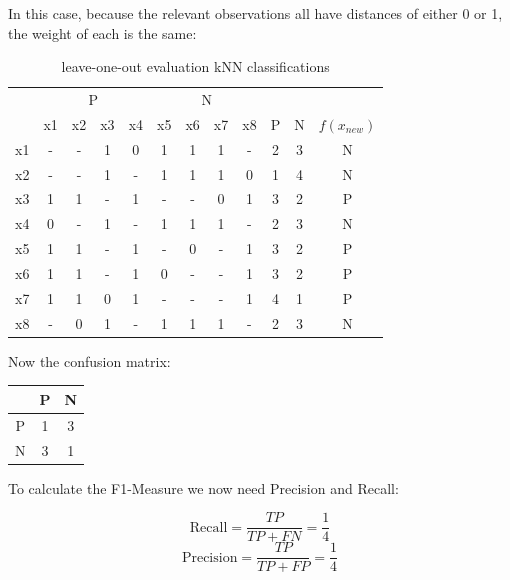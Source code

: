 \documentclass{article}
\begin{document}
\begin{enumerate}[leftmargin=\labelsep]
In this case, because the relevant observations all
have distances of either 0 or 1, the weight of each
is the same:

\begin{table}[H]
  \centering
  \begin{tabular}{c|cccc|cccc|ccc}
    \multicolumn{1}{c}{} & \multicolumn{4}{c}{P} & \multicolumn{4}{c}{N}  \\
      & x1 & x2 & x3 & x4 & x5 & x6 & x7 & x8 & P & N & $f(x_{new})$ \\ \hline
  x1  & -  & -  & 1  & 0  & 1  & 1  & 1  & -  & 2 & 3 & N \\
  x2  & -  & -  & 1  & -  & 1  & 1  & 1  & 0  & 1 & 4 & N \\
  x3  & 1  & 1  & -  & 1  & -  & -  & 0  & 1  & 3 & 2 & P \\
  x4  & 0  & -  & 1  & -  & 1  & 1  & 1  & -  & 2 & 3 & N \\
  x5  & 1  & 1  & -  & 1  & -  & 0  & -  & 1  & 3 & 2 & P \\
  x6  & 1  & 1  & -  & 1  & 0  & -  & -  & 1  & 3 & 2 & P \\
  x7  & 1  & 1  & 0  & 1  & -  & -  & -  & 1  & 4 & 1 & P \\
  x8  & -  & 0  & 1  & -  & 1  & 1  & 1  & -  & 2 & 3 & N \\ \hline
  \end{tabular}
  \caption{leave-one-out evaluation kNN classifications}
\end{table}

Now the confusion matrix:
\begin{table}[H]
  \centering
  \begin{tabular}{@{}ccc}
    & P & N \\ \midrule 
    P & 1 & 3 \\
    N & 3 & 1 \\
  \end{tabular}
\end{table}

To calculate the F1-Measure we now need Precision and Recall:

\begin{equation*}
  \text{Recall} = \frac{TP}{TP + FN} = \frac{1}{4}
\end{equation*}
\begin{equation*}
  \text{Precision} = \frac{TP}{TP + FP} = \frac{1}{4}
\end{equation*}


\end{enumerate}
\end{document}
